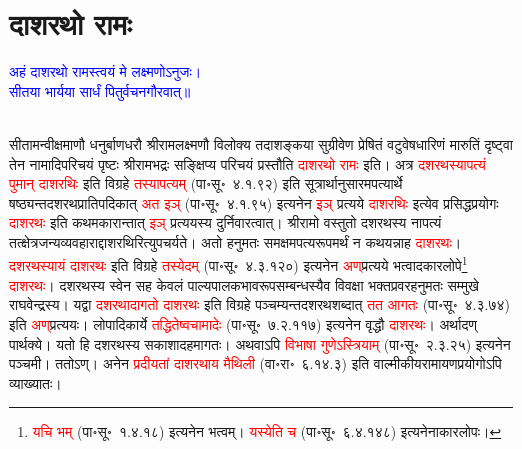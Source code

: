 \section[दाशरथो रामः]{दाशरथो रामः}
\centering\textcolor{blue}{अहं दाशरथो रामस्त्वयं मे लक्ष्मणोऽनुजः।\nopagebreak\\
सीतया भार्यया सार्धं पितुर्वचनगौरवात्॥}\nopagebreak\\
\\
\begin{sloppypar}\justifying\noindent\hspace{10mm} सीतामन्वीक्षमाणौ धनुर्बाणधरौ श्रीराम\-लक्ष्मणौ विलोक्य
तदाशङ्कया
सुग्रीवेण प्रेषितं वटु\-वेष\-धारिणं मारुतिं दृष्ट्वा तेन नामादि\-परिचयं पृष्टः श्रीरामभद्रः सङ्क्षिप्य परिचयं प्रस्तौति \textcolor{red}{दाशरथो रामः} इति। अत्र \textcolor{red}{दशरथस्यापत्यं पुमान् दाशरथिः} इति विग्रहे \textcolor{red}{तस्यापत्यम्} (पा॰सू॰~४.१.९२) इति सूत्रार्थानुसारमपत्यार्थे षष्ठ्यन्त\-दशरथ\-प्रातिपदिकात् \textcolor{red}{अत इञ्} (पा॰सू॰~४.१.९५) इत्यनेन \textcolor{red}{इञ्} प्रत्यये \textcolor{red}{दाशरथिः} इत्येव प्रसिद्ध\-प्रयोगः \textcolor{red}{दाशरथः} इति कथमकारान्तात् \textcolor{red}{इञ्} प्रत्ययस्य दुर्निवारत्वात्। श्रीरामो वस्तुतो दशरथस्य नापत्यं तत्क्षेत्र\-जन्य\-व्यवहाराद्दाशरथिरित्युपचर्यते। अतो हनुमतः समक्षमपत्य\-रूपमर्थं न कथयन्नाह \textcolor{red}{दाशरथः}। \textcolor{red}{दशरथस्यायं दाशरथः} इति विग्रहे \textcolor{red}{तस्येदम्} (पा॰सू॰~४.३.१२०) इत्यनेन \textcolor{red}{अण्‌}\-प्रत्यये भत्वादकार\-लोपे\footnote{\textcolor{red}{यचि भम्} (पा॰सू॰~१.४.१८) इत्यनेन भत्वम्। \textcolor{red}{यस्येति च} (पा॰सू॰~६.४.१४८) इत्यनेनाकार\-लोपः।} \textcolor{red}{दाशरथः}। दशरथस्य स्वेन सह केवलं पाल्य\-पालक\-भाव\-रूप\-सम्बन्धस्यैव विवक्षा भक्त\-प्रवर\-हनुमतः सम्मुखे राघवेन्द्रस्य। यद्वा \textcolor{red}{दशरथादागतो दाशरथः} इति विग्रहे पञ्चम्यन्त\-दशरथ\-शब्दात् \textcolor{red}{तत आगतः} (पा॰सू॰~४.३.७४) इति \textcolor{red}{अण्‌}\-प्रत्ययः। लोपादि\-कार्ये \textcolor{red}{तद्धितेष्वचामादेः} (पा॰सू॰~७.२.११७) इत्यनेन वृद्धौ \textcolor{red}{दाशरथः}। अर्थादण् पार्थक्ये। यतो हि दशरथस्य सकाशादहमागतः। अथवाऽपि \textcolor{red}{विभाषा गुणेऽस्त्रियाम्} (पा॰सू॰~२.३.२५) इत्यनेन पञ्चमी। ततोऽण्। अनेन \textcolor{red}{प्रदीयतां दाशरथाय मैथिली} (वा॰रा॰~६.१४.३) इति वाल्मीकीय\-रामायण\-प्रयोगोऽपि व्याख्यातः।\end{sloppypar}
